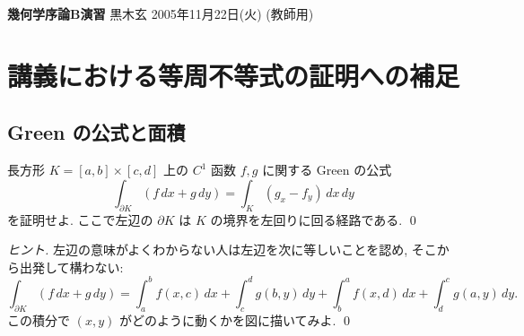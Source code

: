 \documentclass[12pt,twoside]{jarticle}
\newcommand\commentout[1]{#1}
\newcommand\commentout[1]{}
\begin{document}
\noindent
{\Large\bf 幾何学序論B演習}
\hfill
{\large 黒木玄}
\qquad
2005年11月22日(火)
\commentout{\quad (教師用)}
\tableofcontents

\section{講義における等周不等式の証明への補足}


\subsection{Green の公式と面積}

\begin{question}
 長方形 $K=[a,b]\times [c,d]$ 上の $C^1$ 函数 $f,g$ に関する Green の公式
 \begin{equation*}
  \int_{\partial K} (f\,dx + g\,dy) = \int_K (g_x - f_y)\,dx\,dy
 \end{equation*}
 を証明せよ. ここで左辺の $\partial K$ は $K$ の境界を左回りに回る経路である. \qed
\end{question}

\begin{proof}[ヒント]
 左辺の意味がよくわからない人は左辺を次に等しいことを認め,
 そこから出発して構わない:
 \begin{equation*}
  \int_{\partial K} (f\,dx + g\,dy)
   = \int_a^b f(x,c) \,dx
   + \int_c^d g(b,y) \,dy
   + \int_b^a f(x,d) \,dx
   + \int_d^c g(a,y) \,dy.
 \end{equation*}
 この積分で $(x,y)$ がどのように動くかを図に描いてみよ. \qed
\end{proof}
\end{document}
